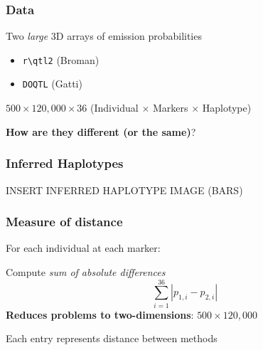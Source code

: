 \documentclass[12pt,t]{beamer}
\begin{document}
	\begin{frame}
		\frametitle{Data}
		\vspace{0.3in}
		Two \textit{large} 3D arrays of emission probabilities \\
		
		\vspace{0.25in}

		\begin{itemize}
			\item \texttt{r\textbackslash qtl2} (Broman)
			\item \texttt{DOQTL} (Gatti) \\
		\end{itemize}
		
		\vspace{0.25in}

		\pause $500 \times 120,000 \times 36$ \qquad (Individual $\times$ Markers $\times$ Haplotype)
		
		\vspace{0.25in}
		
		\pause \textbf{How are they different (or the same)}?
	\end{frame}
	
	\begin{frame}
		\frametitle{Inferred Haplotypes}
			INSERT INFERRED HAPLOTYPE IMAGE (BARS)
	\end{frame}
	
	\begin{frame}
		\frametitle{Measure of distance}
		
		\vspace{0.3in}
		\pause For each individual at each marker: \newline
		
		Compute \textit{sum of absolute differences} 
		$$\sum_{i=1}^{36} |p_{1,i} - p_{2,i}|$$
		\pause \textbf{Reduces problems to two-dimensions}: \pause $500 \times 120,000$ \newline
		
		\pause Each entry represents distance between methods
	\end{frame}
		
	
	
\end{document}
